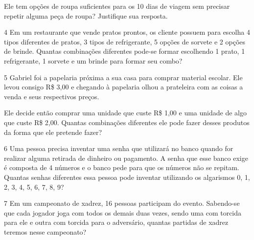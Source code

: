 Ele tem opções de roupa suficientes para os 10 dias de viagem sem
precisar repetir alguma peça de roupa? Justifique sua resposta.



\num{4} Em um restaurante que vende pratos prontos, os cliente possuem para
escolha 4 tipos diferentes de pratos, 3 tipos de refrigerante, 5 opções
de sorvete e 2 opções de brinde. Quantas combinações diferentes pode-se
formar escolhendo 1 prato, 1 refrigerante, 1 sorvete e um brinde para
formar seu combo?



\num{5} Gabriel foi a papelaria próxima a sua casa para comprar material
escolar. Ele levou consigo R\$ 3,00 e chegando à papelaria olhou a
prateleira com as coisas a venda e seus respectivos preços.


Ele decide então comprar uma unidade que custe R\$ 1,00 e uma unidade de
algo que custe R\$ 2,00. Quantas combinações diferentes ele pode fazer
desses produtos da forma que ele pretende fazer?



\num{6} Uma pessoa precisa inventar uma senha que utilizará no banco quando
for realizar alguma retirada de dinheiro ou pagamento. A senha que esse
banco exige é composta de 4 números e o banco pede para que os números
não se repitam. Quantas senhas diferentes essa pessoa pode inventar
utilizando os algarismos 0, 1, 2, 3, 4, 5, 6, 7, 8, 9?



\num{7} Em um campeonato de xadrez, 16 pessoas participam do evento.
Sabendo-se que cada jogador joga com todos os demais duas vezes, sendo
uma com torcida para ele e outra com torcida para o adversário, quantas
partidas de xadrez teremos nesse campeonato?

